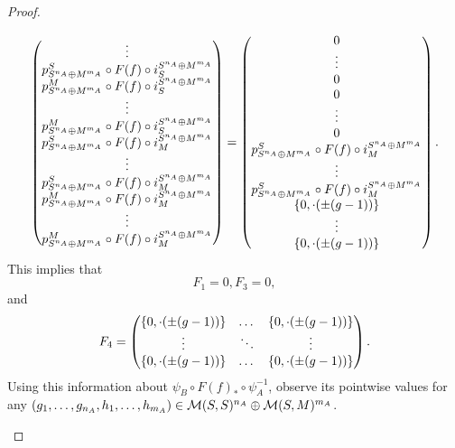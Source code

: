 \begin{proof}
\begin{enumerate}
{\[\begin{pmatrix}
                    \vdots \\
                    p_{S^{n_A} \oplus M^{m_A}}^S \circ F(f) \circ i_S^{S^{n_A} \oplus M^{m_A}} \\
                    p_{S^{n_A} \oplus M^{m_A}}^M \circ F(f) \circ i_S^{S^{n_A} \oplus M^{m_A}} \\
                    \vdots \\
                    p_{S^{n_A} \oplus M^{m_A}}^M \circ F(f) \circ i_S^{S^{n_A} \oplus M^{m_A}} \\
                    p_{S^{n_A} \oplus M^{m_A}}^S \circ F(f) \circ i_M^{S^{n_A} \oplus M^{m_A}} \\
                    \vdots \\
                    p_{S^{n_A} \oplus M^{m_A}}^S \circ F(f) \circ i_M^{S^{n_A} \oplus M^{m_A}} \\
                    p_{S^{n_A} \oplus M^{m_A}}^M \circ F(f) \circ i_M^{S^{n_A} \oplus M^{m_A}} \\
                    \vdots \\
                    p_{S^{n_A} \oplus M^{m_A}}^M \circ F(f) \circ i_M^{S^{n_A} \oplus M^{m_A}}
                \end{pmatrix}
                = \begin{pmatrix}
                    0 \\
                    \vdots \\
                    0 \\
                    0 \\
                    \vdots \\
                    0 \\
                    p_{S^{n_A} \oplus M^{m_A}}^S \circ F(f) \circ i_M^{S^{n_A} \oplus M^{m_A}} \\
                    \vdots \\
                    p_{S^{n_A} \oplus M^{m_A}}^S \circ F(f) \circ i_M^{S^{n_A} \oplus M^{m_A}} \\
                    \left\{ 0, \cdot(\pm(g - 1)) \right\} \\
                    \vdots \\
                    \left\{ 0, \cdot(\pm(g - 1)) \right\}
                \end{pmatrix}.
            \]
            This implies that
            \[
                F_1 = 0, F_3 = 0,
            \]
            and
            \[
                F_4 = \begin{pmatrix}
                    \left\{ 0, \cdot(\pm(g - 1)) \right\} & \dots & \left\{ 0, \cdot(\pm(g - 1)) \right\} \\
                    \vdots & \ddots & \vdots \\
                    \left\{ 0, \cdot(\pm(g - 1)) \right\} & \dots & \left\{ 0, \cdot(\pm(g - 1)) \right\}
                \end{pmatrix}.
            \]
            Using this information about \( \psi_B \circ F(f)_* \circ \psi_A^{-1} \), observe its pointwise values for any \( \left( g_1, \dots, g_{n_A}, h_1, \dots, h_{m_A} \right) \in {\mathcal{M}}(S, S)^{n_A} \oplus {\mathcal{M}}(S, M)^{m_A} \).
            
}
\end{enumerate}
\end{proof}
